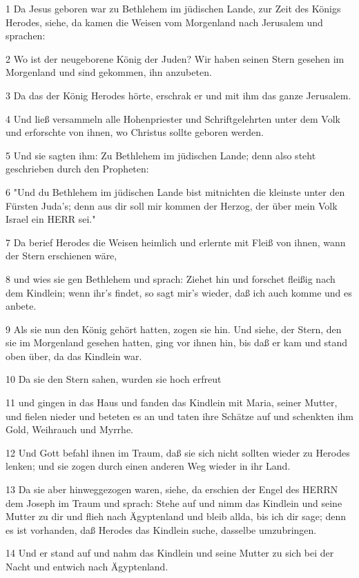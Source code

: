\par 1 Da Jesus geboren war zu Bethlehem im jüdischen Lande, zur Zeit des Königs Herodes, siehe, da kamen die Weisen vom Morgenland nach Jerusalem und sprachen:
\par 2 Wo ist der neugeborene König der Juden? Wir haben seinen Stern gesehen im Morgenland und sind gekommen, ihn anzubeten.
\par 3 Da das der König Herodes hörte, erschrak er und mit ihm das ganze Jerusalem.
\par 4 Und ließ versammeln alle Hohenpriester und Schriftgelehrten unter dem Volk und erforschte von ihnen, wo Christus sollte geboren werden.
\par 5 Und sie sagten ihm: Zu Bethlehem im jüdischen Lande; denn also steht geschrieben durch den Propheten:
\par 6 "Und du Bethlehem im jüdischen Lande bist mitnichten die kleinste unter den Fürsten Juda's; denn aus dir soll mir kommen der Herzog, der über mein Volk Israel ein HERR sei."
\par 7 Da berief Herodes die Weisen heimlich und erlernte mit Fleiß von ihnen, wann der Stern erschienen wäre,
\par 8 und wies sie gen Bethlehem und sprach: Ziehet hin und forschet fleißig nach dem Kindlein; wenn ihr's findet, so sagt mir's wieder, daß ich auch komme und es anbete.
\par 9 Als sie nun den König gehört hatten, zogen sie hin. Und siehe, der Stern, den sie im Morgenland gesehen hatten, ging vor ihnen hin, bis daß er kam und stand oben über, da das Kindlein war.
\par 10 Da sie den Stern sahen, wurden sie hoch erfreut
\par 11 und gingen in das Haus und fanden das Kindlein mit Maria, seiner Mutter, und fielen nieder und beteten es an und taten ihre Schätze auf und schenkten ihm Gold, Weihrauch und Myrrhe.
\par 12 Und Gott befahl ihnen im Traum, daß sie sich nicht sollten wieder zu Herodes lenken; und sie zogen durch einen anderen Weg wieder in ihr Land.
\par 13 Da sie aber hinweggezogen waren, siehe, da erschien der Engel des HERRN dem Joseph im Traum und sprach: Stehe auf und nimm das Kindlein und seine Mutter zu dir und flieh nach Ägyptenland und bleib allda, bis ich dir sage; denn es ist vorhanden, daß Herodes das Kindlein suche, dasselbe umzubringen.
\par 14 Und er stand auf und nahm das Kindlein und seine Mutter zu sich bei der Nacht und entwich nach Ägyptenland.
